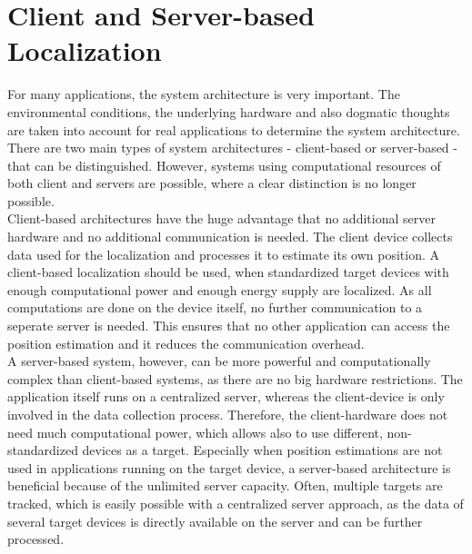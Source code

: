 \section{Client and Server-based Localization}
For many applications, the system architecture is very important. The environmental conditions, the underlying hardware and also dogmatic thoughts are taken into account for real applications to determine the system architecture. There are two main types of system architectures - client-based or server-based - that can be distinguished. However, systems using computational resources of both client and servers are possible, where a clear distinction is no longer possible.\\
\noindent\hspace*{5mm}%
Client-based architectures have the huge advantage that no additional server hardware and no additional communication is needed. The client device collects data used for the localization and processes it to estimate its own position. A client-based localization should be used, when standardized target devices with enough computational power and enough energy supply are localized. As all computations are done on the device itself, no further communication to a seperate server is needed. This ensures that no other application can access the position estimation and it reduces the communication overhead.\\
\noindent\hspace*{5mm}%
A server-based system, however, can be more powerful and computationally complex than client-based systems, as there are no big hardware restrictions. The application itself runs on a centralized server, whereas the client-device is only involved in the data collection process. Therefore, the client-hardware does not need much computational power, which allows also to use different, non-standardized devices as a target. Especially when position estimations are not used in applications running on the target device, a server-based architecture is beneficial because of the unlimited server capacity. Often, multiple targets are tracked, which is easily possible with a centralized server approach, as the data of several target devices is directly available on the server and can be further processed. 


